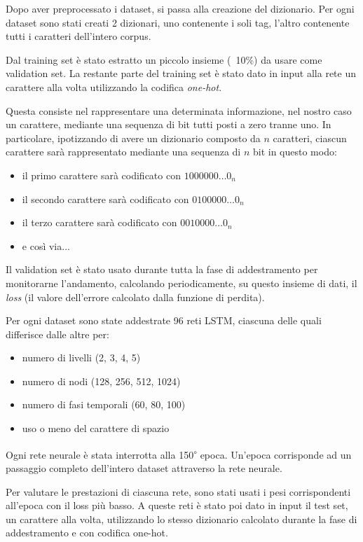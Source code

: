 Dopo aver preprocessato i dataset, si passa alla creazione del dizionario. Per
ogni dataset sono stati creati 2 dizionari, uno contenente i soli tag, l'altro
contenente tutti i caratteri dell'intero corpus.

Dal training set \`e stato estratto un piccolo insieme (~10\%) da usare come
validation set. La restante parte del training set \`e stato dato in input alla
rete un carattere alla volta utilizzando la codifica \emph{one-hot}.

Questa consiste nel rappresentare una determinata informazione, nel nostro caso
un carattere, mediante una sequenza di bit tutti posti a zero tranne uno. In
particolare, ipotizzando di avere un dizionario composto da $n$ caratteri,
ciascun carattere sar\`a rappresentato mediante una sequenza di $n$ bit in questo modo:

\begin{itemize}
  \item il primo carattere sar\`a codificato con $1000000\dots0_{n}$
  \item il secondo carattere sar\`a codificato con $0100000\dots0_{n}$
  \item il terzo carattere sar\`a codificato con $0010000\dots0_{n}$
  \item e cos\`i via...
\end{itemize}

Il validation set \`e stato usato durante tutta la fase di addestramento per
monitorarne l'andamento, calcolando periodicamente, su questo insieme di dati,
il \emph{loss} (il valore dell'errore calcolato dalla funzione di perdita).

Per ogni dataset sono state addestrate 96 reti LSTM, ciascuna delle quali
differisce dalle altre per:

\begin{itemize}
  \item numero di livelli (2, 3, 4, 5)
  \item numero di nodi (128, 256, 512, 1024)
  \item numero di fasi temporali (60, 80, 100)
  \item uso o meno del carattere di spazio
\end{itemize}

Ogni rete neurale \`e stata interrotta alla 150\textsuperscript{$\circ$} epoca.
Un'epoca corrisponde ad un passaggio completo dell'intero dataset attraverso la
rete neurale.

Per valutare le prestazioni di ciascuna rete, sono stati usati i pesi corrispondenti
all'epoca con il loss pi\`u basso. A queste reti \`e stato poi dato in input il
test set, un carattere alla volta, utilizzando lo stesso dizionario calcolato
durante la fase di addestramento e con codifica one-hot.

